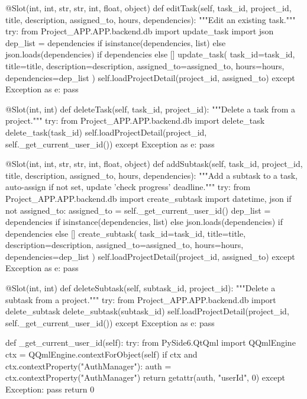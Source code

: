 \documentclass{report}
\begin{document}
\begin{python}
    @Slot(int, int, str, str, int, float, object)
    def editTask(self, task_id, project_id, title, description, assigned_to, hours, dependencies):
        """Edit an existing task."""
        try:
            from Project_APP.APP.backend.db import update_task
            import json
            dep_list = dependencies if isinstance(dependencies, list) else json.loads(dependencies) if dependencies else []
            update_task(
                task_id=task_id,
                title=title,
                description=description,
                assigned_to=assigned_to,
                hours=hours,
                dependencies=dep_list
            )
            self.loadProjectDetail(project_id, assigned_to)
        except Exception as e:
            pass

    @Slot(int, int)
    def deleteTask(self, task_id, project_id):
        """Delete a task from a project."""
        try:
            from Project_APP.APP.backend.db import delete_task
            delete_task(task_id)
            self.loadProjectDetail(project_id, self._get_current_user_id())
        except Exception as e:
            pass

    @Slot(int, int, str, str, int, float, object)
    def addSubtask(self, task_id, project_id, title, description, assigned_to, hours, dependencies):
        """Add a subtask to a task, auto-assign if not set, update 'check progress' deadline."""
        try:
            from Project_APP.APP.backend.db import create_subtask
            import datetime, json
            if not assigned_to:
                assigned_to = self._get_current_user_id()
            dep_list = dependencies if isinstance(dependencies, list) else json.loads(dependencies) if dependencies else []
            create_subtask(
                task_id=task_id,
                title=title,
                description=description,
                assigned_to=assigned_to,
                hours=hours,
                dependencies=dep_list
            )
            self.loadProjectDetail(project_id, assigned_to)
        except Exception as e:
            pass

    @Slot(int, int)
    def deleteSubtask(self, subtask_id, project_id):
        """Delete a subtask from a project."""
        try:
            from Project_APP.APP.backend.db import delete_subtask
            delete_subtask(subtask_id)
            self.loadProjectDetail(project_id, self._get_current_user_id())
        except Exception as e:
            pass

    def _get_current_user_id(self):
        try:
            from PySide6.QtQml import QQmlEngine
            ctx = QQmlEngine.contextForObject(self)
            if ctx and ctx.contextProperty("AuthManager"):
                auth = ctx.contextProperty("AuthManager")
                return getattr(auth, "userId", 0)
        except Exception:
            pass
        return 0


\end{python}
\end{document}

